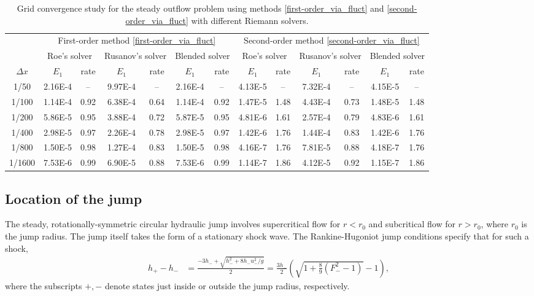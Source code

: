 \documentclass[preprint, 11pt]{article}
\begin{document}
\begin{table}[!ht]\scriptsize
  \begin{center}
    \begin{tabular}{||c||c|c||c|c||c|c||c|c||c|c||c|c||} \hline
      & \multicolumn{6}{c||}{First-order method \eqref{first-order_via_fluct}}
      & \multicolumn{6}{c||}{Second-order method \eqref{second-order_via_fluct}} \\ \cline{2-13}
      & \multicolumn{2}{c||}{Roe's solver}
      &\multicolumn{2}{c||}{Rusanov's solver}
      &\multicolumn{2}{c||}{Blended solver}
      & \multicolumn{2}{c||}{Roe's solver}
      &\multicolumn{2}{c||}{Rusanov's solver}
      &\multicolumn{2}{c||}{Blended solver}
      \\ \cline{2-13}
      $\Delta x$ & $E_1$ & rate & $E_1$ & rate & $E_1$ & rate & $E_1$ & rate & $E_1$ & rate & $E_1$ & rate\\ \hline
      1/50   & 2.16E-4 &  --  & 9.97E-4 &   -- & 2.16E-4 & --   & 4.13E-5 &   -- & 7.32E-4 &  --  & 4.15E-5 & --   \\
      1/100  & 1.14E-4 & 0.92 & 6.38E-4 & 0.64 & 1.14E-4 & 0.92 & 1.47E-5 & 1.48 & 4.43E-4 & 0.73 & 1.48E-5 & 1.48 \\
      1/200  & 5.86E-5 & 0.95 & 3.88E-4 & 0.72 & 5.87E-5 & 0.95 & 4.81E-6 & 1.61 & 2.57E-4 & 0.79 & 4.83E-6 & 1.61 \\
      1/400  & 2.98E-5 & 0.97 & 2.26E-4 & 0.78 & 2.98E-5 & 0.97 & 1.42E-6 & 1.76 & 1.44E-4 & 0.83 & 1.42E-6 & 1.76 \\
      1/800  & 1.50E-5 & 0.98 & 1.27E-4 & 0.83 & 1.50E-5 & 0.98 & 4.16E-7 & 1.76 & 7.81E-5 & 0.88 & 4.18E-7 & 1.76 \\
      1/1600 & 7.53E-6 & 0.99 & 6.90E-5 & 0.88 & 7.53E-6 & 0.99 & 1.14E-7 & 1.86 & 4.12E-5 & 0.92 & 1.15E-7 & 1.86 \\ \hline
    \end{tabular}
    \caption{Grid convergence study for the steady outflow problem
      using methods \eqref{first-order_via_fluct} and \eqref{second-order_via_fluct}
      with different Riemann solvers.\label{table:steady_outflow}}
  \end{center}
\end{table}

\subsection{Location of the jump} \label{sec:jumploc}
The steady, rotationally-symmetric circular hydraulic jump involves supercritical
flow for $r<r_0$ and subcritical flow for $r>r_0$, where $r_0$ is the jump radius.
The jump itself takes the form of a stationary shock wave.  The Rankine-Hugoniot jump
conditions specify that for such a shock,
\begin{align} \label{eq:RH}
    h_+ - h_- & = \frac{-3h_- + \sqrt{h_-^2 + 8 h_- u_-^2/g}}{2} = \frac{3h_-}{2}\left(\sqrt{1+\frac{8}{9}(F_-^2-1)}-1\right),
\end{align}
where the subscripts $+, -$ denote states just inside or outside the jump radius, respectively.
\end{document}
